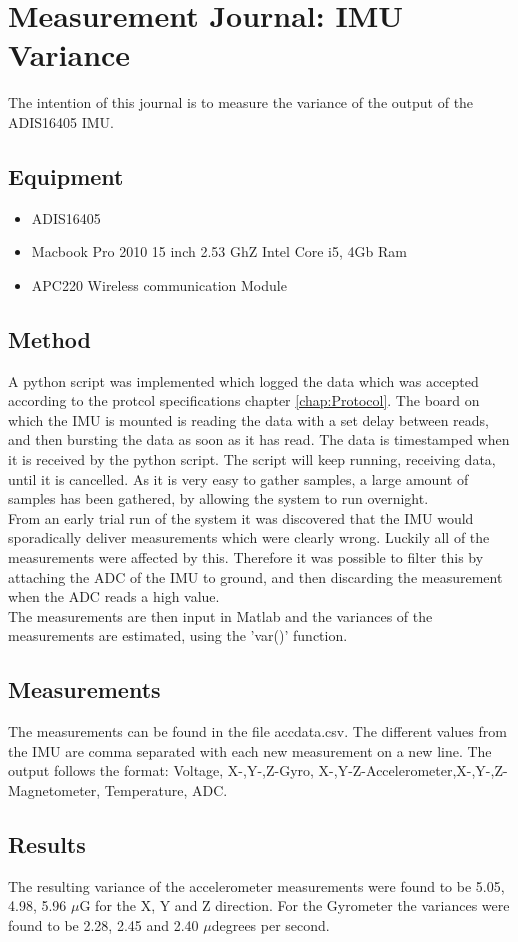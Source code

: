 \chapter{Measurement Journal: IMU Variance}
\label{chap:MeasJourIMU}
The intention of this journal is to measure the variance of the output of the ADIS16405 IMU.
\section{Equipment}
\begin{itemize}
\item ADIS16405
\item Macbook Pro 2010 15 inch 2.53 GhZ Intel Core i5, 4Gb Ram
\item APC220 Wireless communication Module
\end{itemize}

\section{Method}
A python script was implemented which logged the data which was accepted according to the protcol specifications chapter \ref{chap:Protocol}. The board on which the IMU is mounted is reading the data with a set delay between reads, and then bursting the data as soon as it has read. The data is timestamped when it is received by the python script. The script will keep running, receiving data, until it is cancelled. As it is very easy to gather samples, a large amount of samples has been gathered, by allowing the system to run overnight.\\
From an early trial run of the system it was discovered that the IMU would sporadically deliver measurements which were clearly wrong. Luckily all of the measurements were affected by this. Therefore it was possible to filter this by attaching the ADC of the IMU to ground, and then discarding the measurement when the ADC reads a high value.\\
The measurements are then input in Matlab and the variances of the measurements are estimated, using the 'var()' function.
\section{Measurements}
The measurements can be found in the file accdata.csv. The different values from the IMU are comma separated with each new measurement on a new line. The output follows the format: Voltage, X-,Y-,Z-Gyro, X-,Y-Z-Accelerometer,X-,Y-,Z-Magnetometer, Temperature, ADC.
\section{Results}
The resulting variance of the accelerometer measurements were found to be 5.05, 4.98, 5.96 $\mu$G for the X, Y and Z direction. 
For the Gyrometer the variances were found to be 2.28, 2.45 and 2.40 $\mu$degrees per second.